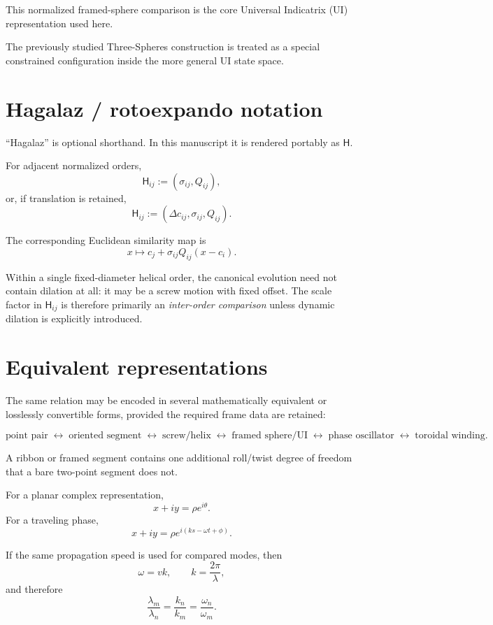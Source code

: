 \documentclass[11pt]{article}
\newcommand{\Hag}{\mathsf{H}}
\begin{document}
This normalized framed-sphere comparison is the core Universal Indicatrix (UI)
representation used here.

The previously studied Three-Spheres construction is treated as a special
constrained configuration inside the more general UI state space.

\section{Hagalaz / rotoexpando notation}

``Hagalaz'' is optional shorthand.  In this manuscript it is rendered
portably as $\Hag$.

For adjacent normalized orders,
\[
\Hag_{ij}:=(\sigma_{ij},Q_{ij}),
\]
or, if translation is retained,
\[
\Hag_{ij}:=(\Delta c_{ij},\sigma_{ij},Q_{ij}).
\]

The corresponding Euclidean similarity map is
\[
x\mapsto c_j+\sigma_{ij}Q_{ij}(x-c_i).
\]

Within a single fixed-diameter helical order, the canonical evolution need not
contain dilation at all: it may be a screw motion with fixed offset.  The scale
factor in $\Hag_{ij}$ is therefore primarily an \emph{inter-order comparison}
unless dynamic dilation is explicitly introduced.

\section{Equivalent representations}

The same relation may be encoded in several mathematically equivalent or
losslessly convertible forms, provided the required frame data are retained:

\[
\text{point pair}
\;\leftrightarrow\;
\text{oriented segment}
\;\leftrightarrow\;
\text{screw/helix}
\;\leftrightarrow\;
\text{framed sphere/UI}
\;\leftrightarrow\;
\text{phase oscillator}
\;\leftrightarrow\;
\text{toroidal winding}.
\]

A ribbon or framed segment contains one additional roll/twist degree of freedom
that a bare two-point segment does not.

For a planar complex representation,
\[
x+iy=\rho e^{i\theta}.
\]
For a traveling phase,
\[
x+iy=\rho e^{i(ks-\omega t+\phi)}.
\]

If the same propagation speed is used for compared modes, then
\[
\omega=vk,
\qquad
k=\frac{2\pi}{\lambda},
\]
and therefore
\[
\frac{\lambda_m}{\lambda_n}
=
\frac{k_n}{k_m}
=
\frac{\omega_n}{\omega_m}.
\]
\end{document}
